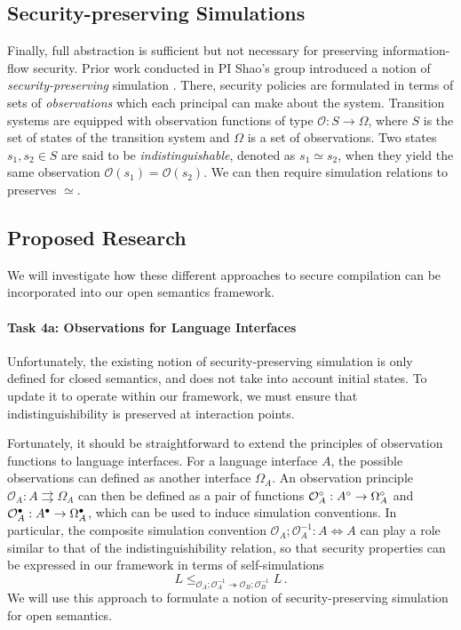\subsection{Security-preserving Simulations}

Finally,
full abstraction is sufficient but not necessary
for preserving information-flow security.
Prior work conducted in PI Shao's group
introduced a notion of \emph{security-preserving} simulation
\cite{costanzo16}.
There,
security policies are formulated in terms
of sets of \emph{observations} 
which each principal can make about the system.
Transition systems are equipped with observation functions of type
$\mathcal{O} : S \rightarrow \Omega$,
where $S$ is the set of states of the transition system and
$\Omega$ is a set of observations.
Two states $s_1, s_2 \in S$
are said to be \emph{indistinguishable},
denoted as $s_1 \simeq s_2$,
when they yield the same observation
$\mathcal{O}(s_1) = \mathcal{O}(s_2)$.
We can then require
simulation relations to preserves $\simeq$.

\subsection{Proposed Research}

We will investigate how these different approaches to secure compilation
can be incorporated into our open semantics framework.

\vspace*{-2ex}
\paragraph*{Task 4a: Observations for Language Interfaces}

Unfortunately,
the existing notion of security-preserving simulation
is only defined for closed semantics,
and does not take into account initial states.
To update it to operate within our framework,
we must ensure that indistinguishibility is preserved
at interaction points.

Fortunately,
it should be straightforward to extend
the principles of observation functions to language interfaces.
For a language interface $A$,
the possible observations can defined as another interface $\Omega_A$.
An observation principle
$\mathcal{O}_A : A \rightrightarrows \Omega_A$
can then be defined as a pair of functions
$
  \mathcal{O}_A^\circ : A^\circ \rightarrow \Omega_A^\circ
$
and
$
  \mathcal{O}_A^\bullet : A^\bullet \rightarrow \Omega_A^\bullet
$,
which can be used to induce simulation conventions.
In particular,
the composite simulation convention
$
  \mathcal{O}_A \mathbin; \mathcal{O}_A^{-1} :
  A \Leftrightarrow A
$
can play a role similar to that of the indistinguishibility relation,
so that security properties can be expressed
in our framework
in terms of self-simulations
\[
  L \le_{\mathcal{O}_A \mathbin; \mathcal{O}_A^{-1} \twoheadrightarrow
         \mathcal{O}_B \mathbin; \mathcal{O}_B^{-1}} L
  \,.
\]
We will use this approach
to formulate a notion of security-preserving simulation
for open semantics.

